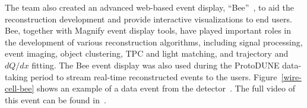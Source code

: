 The  team also created an advanced web-based \threed event display, ``Bee''~\cite{wire-cell-bee}, to aid the reconstruction development and provide interactive visualizations to end users.  Bee, together with \twod Magnify event 
display tools, have played important roles in 
the development of various reconstruction algorithms, including signal processing, \threed event 
imaging, object clustering, TPC and light matching, and trajectory and $dQ/dx$ fitting. The Bee event display 
was also used during the ProtoDUNE data-taking period to stream real-time reconstructed events to the users.
Figure~\ref{wire-cell-bee} shows an example of a data event from the  detector~\cite{ref:wc_bee}. 
The full video of this event can be found in~\cite{ref:bee_video}.





